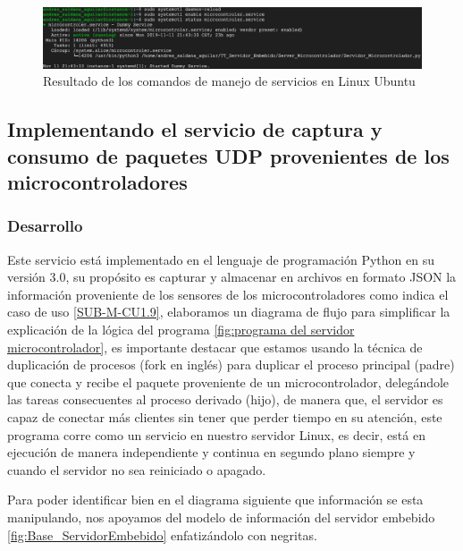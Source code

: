 \begin{figure}[H]
	\centering
	\includegraphics[scale=.35]{Capitulo5/images/systemctl_tests.png}
	\caption{Resultado de los comandos de manejo de servicios en Linux Ubuntu}
	\label{fig:systemctl}
\end{figure} 

\subsection{Implementando el servicio de captura y consumo de paquetes UDP provenientes de los microcontroladores}

\subsubsection{Desarrollo}

Este servicio está implementado en el lenguaje de programación Python en su versión 3.0, su propósito es capturar y almacenar en archivos en formato JSON la información proveniente de los sensores de los microcontroladores como indica el caso de uso \ref{SUB-M-CU1.9}, elaboramos un diagrama de flujo para simplificar la explicación de la lógica del programa \ref{fig:programa del servidor microcontrolador}, es importante destacar que estamos usando la técnica de duplicación de procesos (fork en inglés) para duplicar el proceso principal (padre) que conecta y recibe el paquete proveniente de un microcontrolador, delegándole las tareas consecuentes al proceso derivado (hijo), de manera que, el servidor es capaz de conectar más clientes sin tener que perder tiempo en su atención, este programa corre como un servicio en nuestro servidor Linux, es decir, está en ejecución de manera independiente y continua en segundo plano siempre y cuando el servidor no sea reiniciado o apagado.

Para poder identificar bien en el diagrama siguiente que información se esta manipulando, nos apoyamos del modelo de información del servidor embebido  \ref{fig:Base_ServidorEmbebido} enfatizándolo con negritas.

